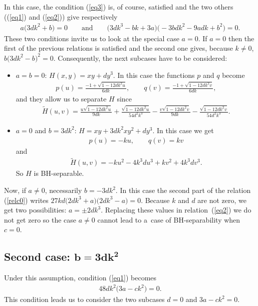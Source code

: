 \documentclass[pdftex]{sigma}%
\numberwithin{equation}{section}
\begin{document}
In this case, the condition (\ref{eq3}) is, of course, satisfied and the two others ((\ref{eq1}) and (\ref{eq2})) give respectively
\begin{gather}\label{relc0}
a\big(3dk^2+b\big)=0\qquad \text{and}\qquad \big(3dk^3-bk+3a\big)\big({-}3bdk^2-9adk+b^2\big)=0.
\end{gather}
These two conditions invite us to look at the special case $a=0$. If $a=0$ then the first of the previous relations is satisfied and the second one gives, because $k\not=0$, $b\big(3dk^2-b\big)^2=0$. Consequently, the next subcases have to be considered:
\begin{itemize}\itemsep=0pt

\item $a=b=0$: $H(x,y)=xy+dy^3$.
In this case the functions $p$ and $q$ become
\begin{gather*}
p(u)=\frac{-1+\sqrt{1-12dk^2u}}{6dk},\qquad q(v)=\frac{-1+\sqrt{1-12dk^2v}}{6dk},
\end{gather*}
and they allow us to separate $H$ since
\begin{gather*}
\widetilde{H}(u,v)=\frac{u\sqrt{1-12dk^2u}}{9dk} +\frac{\sqrt{1-12dk^2u}}{54d^2k^3}-\frac{v\sqrt{1-12dk^2v}}{9dk}-\frac{\sqrt{1-12dk^2v}}{54d^2k^3}.
\end{gather*}

\item $a=0$ and $b=3dk^2$: $H=xy+3dk^2xy^2+dy^3$.
In this case we get
\begin{gather*}
p(u)=-ku,\qquad q(v)=kv
\end{gather*}
and
\begin{gather*}
\widetilde{H}(u,v)=-ku^2-4k^3du^3+kv^2+4k^3dv^3.
\end{gather*}
So $H$ is BH-separable.
\end{itemize}

Now, if $a\not=0$, necessarily $b=-3dk^2$. In this case the second part of the relation (\ref{relc0}) writes $27kd\big(2dk^3+a\big)\big(2dk^3-a\big)=0$. Because $k$ and $d$ are not zero, we get two possibilities: $a=\pm2dk^3$. Replacing these values in relation~(\ref{eq2}) we do not get zero so the case $a\not=0$ cannot lead to a~case of BH-separability when $c=0$.

\subsection*{Second case: $\boldsymbol{b=3dk^2}$}

Under this assumption, condition (\ref{eq1}) becomes
\begin{gather*}%
48dk^2\big(3a-ck^2\big)=0.
\end{gather*}
This condition leads us to consider the two subcases $d=0$ and $3a-ck^2=0$.
\end{document}
